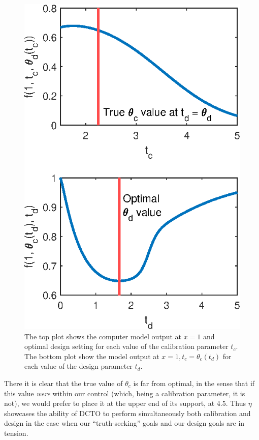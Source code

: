 \documentclass[twocolumn,10pt]{asme2ej}
\begin{document}
\begin{figure}
	\centering
	\includegraphics[scale=0.85]{FIG_true_optimal_theta1_theta2.eps}
	\captionsetup{width=.85\linewidth}
	\caption{The top plot shows the computer model output at $x=1$ and optimal design setting for each value of the calibration parameter $t_c$. The bottom plot show the model output at $x=1,t_c=\theta_c(t_d)$ for each value of the design parameter $t_d$.}
	\label{fig:true_vals}
\end{figure}
%
There it is clear that the true value of $\theta_c$ is far from optimal, in the sense that if this value \textit{were} within our control (which, being a calibration parameter, it is not), we would prefer to place it at the upper end of its support, at 4.5.
%
Thus $\eta$ showcases the ability of DCTO to perform simultaneously both calibration and design in the case when our ``truth-seeking'' goals and our design goals are in tension.
%
\end{document}
